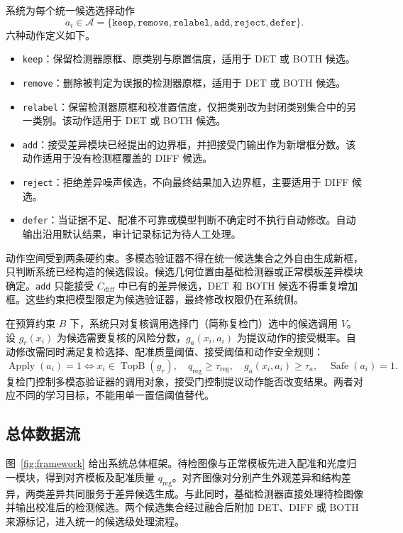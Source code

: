 系统为每个统一候选选择动作
\begin{equation}
  a_i\in\mathcal A=\{\texttt{keep},\texttt{remove},\texttt{relabel},
  \texttt{add},\texttt{reject},\texttt{defer}\}.
  \label{eq:actions}
\end{equation}
六种动作定义如下。
\begin{itemize}
  \item \texttt{keep}：保留检测器原框、原类别与原置信度，适用于 DET 或 BOTH 候选。
  \item \texttt{remove}：删除被判定为误报的检测器原框，适用于 DET 或 BOTH 候选。
  \item \texttt{relabel}：保留检测器原框和校准置信度，仅把类别改为封闭类别集合中的另一类别。该动作适用于 DET 或 BOTH 候选。
  \item \texttt{add}：接受差异模块已经提出的边界框，并把接受门输出作为新增框分数。该动作适用于没有检测框覆盖的 DIFF 候选。
  \item \texttt{reject}：拒绝差异噪声候选，不向最终结果加入边界框，主要适用于 DIFF 候选。
  \item \texttt{defer}：当证据不足、配准不可靠或模型判断不确定时不执行自动修改。自动输出沿用默认结果，审计记录标记为待人工处理。
\end{itemize}

动作空间受到两条硬约束。多模态验证器不得在统一候选集合之外自由生成新框，只判断系统已经构造的候选假设。候选几何位置由基础检测器或正常模板差异模块确定。\texttt{add} 只能接受 $C_{\mathrm{diff}}$ 中已有的差异候选，DET 和 BOTH 候选不得重复增加框。这些约束把模型限定为候选验证器，最终修改权限仍在系统侧。

在预算约束 $B$ 下，系统只对复核调用选择门（简称复检门）选中的候选调用 $V$。设 $g_r(x_i)$ 为候选需要复核的风险分数，$g_a(x_i,a_i)$ 为提议动作的接受概率。自动修改需同时满足复检选择、配准质量阈值、接受阈值和动作安全规则：
\begin{equation}
  \operatorname{Apply}(a_i)=1
  \Longleftrightarrow
  x_i\in\operatorname{TopB}(g_r),\quad
  q_{\mathrm{reg}}\ge\tau_{\mathrm{reg}},\quad
  g_a(x_i,a_i)\ge\tau_a,\quad
  \operatorname{Safe}(a_i)=1.
  \label{eq:apply}
\end{equation}
复检门控制多模态验证器的调用对象，接受门控制提议动作能否改变结果。两者对应不同的学习目标，不能用单一置信阈值替代。

\subsection{总体数据流}

图~\ref{fig:framework} 给出系统总体框架。待检图像与正常模板先进入配准和光度归一模块，得到对齐模板及配准质量 $q_{\mathrm{reg}}$。对齐图像对分别产生外观差异和结构差异，两类差异共同服务于差异候选生成。与此同时，基础检测器直接处理待检图像并输出校准后的检测候选。两个候选集合经过融合后附加 DET、DIFF 或 BOTH 来源标记，进入统一的候选级处理流程。

